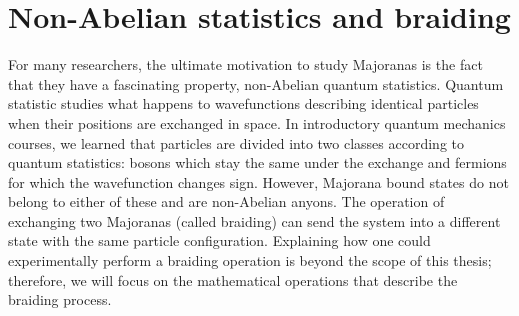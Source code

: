 \section{Non-Abelian statistics and braiding}\label{sec:braiding}
For many researchers, the ultimate motivation to study Majoranas is the fact that they have a fascinating property, non-Abelian quantum statistics.
Quantum statistic studies what happens to wavefunctions describing identical particles when their positions are exchanged in space.
In introductory quantum mechanics courses, we learned that particles are divided into two classes according to quantum statistics: bosons which stay the same under the exchange and fermions for which the wavefunction changes sign.
However, Majorana bound states do not belong to either of these and are non-Abelian anyons.
The operation of exchanging two Majoranas (called braiding) can send the system into a different state with the same particle configuration.
Explaining how one could experimentally perform a braiding operation is beyond the scope of this thesis; therefore, we will focus on the mathematical operations that describe the braiding process.

